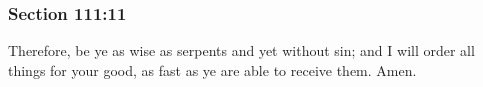 	\subsubsection{Section 111:11} %
		\label{DC111-11}

		Therefore, be ye as wise as serpents and yet without sin; and I will order all things for your good, as fast as ye are able to receive them.  Amen.

